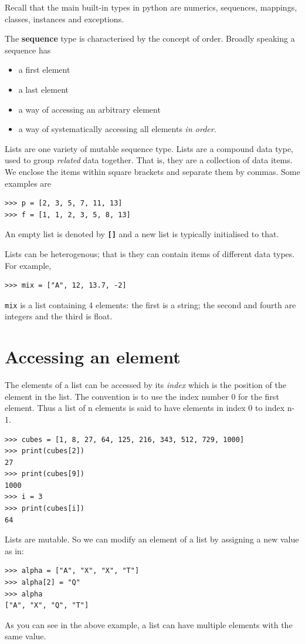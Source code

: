 \documentclass[11pt,a4paper]{article}
\author{TalentSprint}
\date{}
\newcommand{\Code}[1]{\textbf{\texttt{#1}}}
\begin{document}
Recall that the main built-in types in python are numerics, sequences, mappings, classes, instances and exceptions. 

The \textbf{sequence} type is characterised by the concept of order. Broadly speaking a sequence has
\begin{itemize}
    \item a first element
    \item a last element
    \item a way of accessing an arbitrary element
    \item a way of systematically accessing all elements \emph{in order}.
\end{itemize}

Lists are one variety of mutable sequence type. Lists are a compound data type, used to group \emph{related} data together.  That is, they are a collection of data items. We enclose the items within square brackets and separate them by commas. Some examples are

\begin{verbatim}
>>> p = [2, 3, 5, 7, 11, 13]
>>> f = [1, 1, 2, 3, 5, 8, 13]
\end{verbatim}

An empty list is denoted by \Code{[]} and a new list is typically initialised to that.

Lists can be heterogenous; that is they can  contain items of different data types. For example, 
\begin{verbatim}
>>> mix = ["A", 12, 13.7, -2]
\end{verbatim}
\texttt{mix} is a list containing 4 elements: the first is a string; the second and fourth are integers and the third is float.

\section*{Accessing an element}
The elements of a list can be accessed by its \emph{index} which is the position of the element in the list. The convention is to use the index number 0 for the first element. Thus a list of n elements is said to have elements in index 0 to index n-1.
\begin{verbatim}
>>> cubes = [1, 8, 27, 64, 125, 216, 343, 512, 729, 1000]
>>> print(cubes[2])
27
>>> print(cubes[9])
1000
>>> i = 3
>>> print(cubes[i])
64
\end{verbatim}
Lists are mutable. So we can modify an element of a list by assigning a new value as in:
\begin{verbatim}
>>> alpha = ["A", "X", "X", "T"]
>>> alpha[2] = "Q"
>>> alpha
["A", "X", "Q", "T"]
\end{verbatim}
As you can see in the above example, a list can have multiple elements with the same value.
\end{document}
